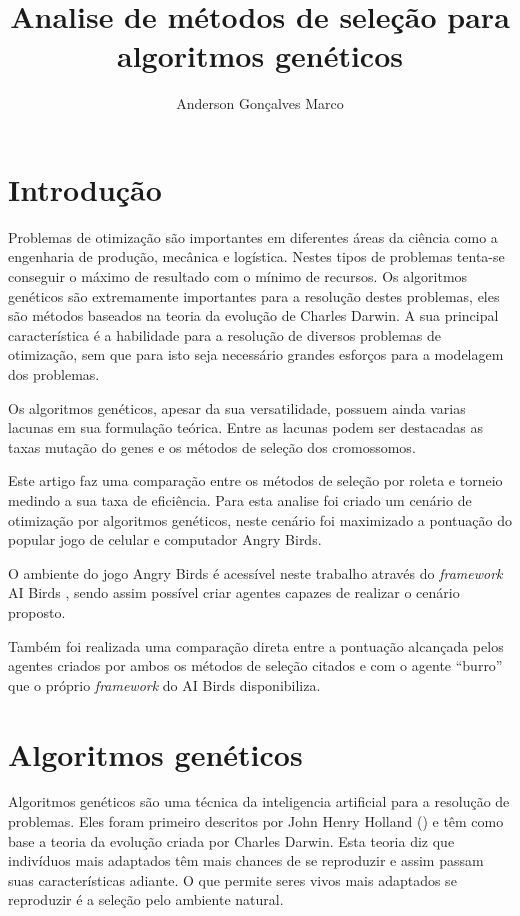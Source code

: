 \documentclass[10pt,a4paper]{article}
\title{Analise de métodos de seleção para algoritmos genéticos}
\author{Anderson Gonçalves Marco}
\date{}
\begin{document}

\maketitle
\section{Introdução}
Problemas de otimização são importantes em diferentes áreas da ciência como a engenharia de produção, mecânica e logística. Nestes tipos de problemas tenta-se conseguir o máximo de resultado com o mínimo de recursos. Os algoritmos genéticos são extremamente importantes para  a resolução destes problemas, eles são métodos baseados na teoria da evolução de Charles Darwin. A sua principal característica é a habilidade para a resolução de diversos problemas de otimização, sem que para isto seja necessário grandes esforços para a modelagem dos problemas.

Os algoritmos genéticos, apesar da sua versatilidade, possuem ainda varias lacunas em sua formulação teórica. Entre as lacunas podem ser destacadas as taxas mutação do genes  e os métodos de seleção dos cromossomos.

Este artigo faz uma comparação entre os métodos de seleção por roleta e torneio medindo a sua taxa de eficiência. Para esta analise foi criado um cenário de otimização por algoritmos genéticos, neste cenário foi maximizado a pontuação do popular jogo de celular e computador Angry Birds. 

O ambiente do jogo Angry Birds é acessível neste trabalho através do \emph{framework} AI Birds \cite{aiBirds}, sendo assim possível criar agentes capazes de realizar o cenário proposto. 

Também foi realizada uma comparação direta entre a pontuação alcançada pelos agentes criados por ambos os métodos de seleção citados e com o agente ``burro'' que o próprio \emph{framework} do AI Birds disponibiliza.

\section{Algoritmos genéticos}
Algoritmos genéticos são uma técnica da inteligencia artificial para a resolução de problemas. Eles foram primeiro descritos por  John Henry Holland (\cite{primeiroAUsarAG}) e têm como  base a teoria da evolução criada por Charles Darwin. Esta teoria diz que indivíduos mais adaptados têm mais chances de se reproduzir e assim passam suas características adiante. O que permite seres vivos mais adaptados se reproduzir é a seleção pelo ambiente natural.
\end{document}
